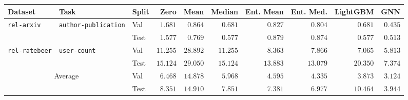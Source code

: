 \begin{tabular}{lllrrrrrrr}
\toprule
Dataset & Task & Split & Zero & Mean & Median & Ent. Mean & Ent. Med. & LightGBM & GNN \\
\midrule
\multirow[c]{2}{*}{\texttt{rel-arxiv}} & \multirow[c]{2}{*}{\texttt{author-publication}} & Val & $1.681$ & $0.864$ & $0.681$ & $0.827$ & $0.804$ & $0.681$ & $\bm{0.435}$ \\
 &  & Test & $1.577$ & $0.769$ & $0.577$ & $0.879$ & $0.874$ & $0.577$ & $\bm{0.513}$ \\
\cmidrule{1-10} \cmidrule{2-10}
\multirow[c]{2}{*}{\texttt{rel-ratebeer}} & \multirow[c]{2}{*}{\texttt{user-count}} & Val & $11.255$ & $28.892$ & $11.255$ & $8.363$ & $7.866$ & $7.065$ & $\bm{5.813}$ \\
 &  & Test & $15.124$ & $29.050$ & $15.124$ & $13.883$ & $13.079$ & $20.350$ & $\bm{7.374}$ \\
\cmidrule{1-10} \cmidrule{2-10}
\multicolumn{2}{c}{\multirow{2}{*}{Average}} & Val
& $6.468$ & $14.878$ & $5.968$ & $4.595$ & $4.335$ & $3.873$ & $3.124$ \\
 &  & Test & $8.351$ & $14.910$ & $7.851$ & $7.381$ & $6.977$ & $10.464$ & $3.944$ \\
\bottomrule
\end{tabular}
